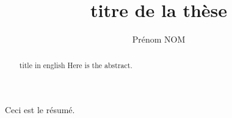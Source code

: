 \documentclass [memoire, letterpaper, oneside, fleqn,12pt]{thETS-utf8}
\title{titre de la thèse}
\author{Prénom NOM}
\begin{document}

\maketitle

\presentjury

\begin{avantpropos}

\end{avantpropos}

\begin{remerciements}

\end{remerciements}

\begin{sommaire}
Ceci est le résumé.
\end{sommaire} 


\begin{abstract}{title in english}
Here is the abstract.
\end{abstract}


\tableofcontents

\listoftables

\listoffigures

\lstlistoflistings
\end{document}
